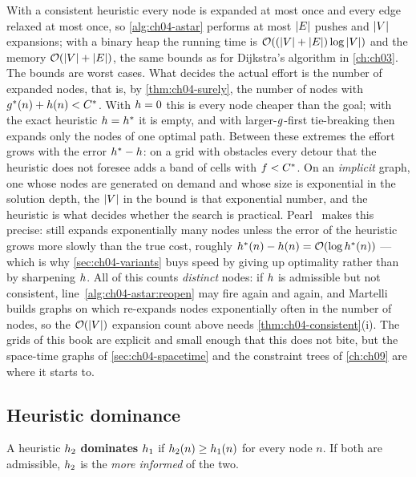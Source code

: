 With a consistent heuristic every node is expanded at most once and every
edge relaxed at most once, so \cref{alg:ch04-astar} performs at most $\left\lvert E \right\rvert$
pushes and $\left\lvert V \right\rvert$ expansions; with a binary heap the running time is
$\mathcal{O}\!\left((\left\lvert V \right\rvert + \left\lvert E \right\rvert) \log \left\lvert V \right\rvert\right)$ and the memory $\mathcal{O}\!\left(\left\lvert V \right\rvert +
\left\lvert E \right\rvert\right)$, the same bounds as for Dijkstra's algorithm in \cref{ch:ch03}. The
bounds are worst cases. What decides the actual effort is the number of
expanded nodes, that is, by \cref{thm:ch04-surely}, the number of nodes with
$g^*(n) + h(n) < C^*$. With $h = 0$ this is every node cheaper
than the goal; with the exact heuristic $h = h^*$ it is empty, and
with larger-$g$-first tie-breaking \astar then expands only the nodes of
one optimal path. Between these extremes the effort grows with the error
$h^* - h$: on a grid with obstacles every detour that the heuristic
does not foresee adds a band of cells with $f < C^*$.
On an \emph{implicit} graph, one whose nodes are generated on demand and whose
size is exponential in the solution depth, the $\left\lvert V \right\rvert$ in the bound is that
exponential number, and the heuristic is what decides whether the search is
practical. Pearl~\cite{pearl1984heuristics} makes this precise: \astar
still expands exponentially many nodes unless the error of the heuristic grows
more slowly than the true cost, roughly $h^*(n) - h(n) =
\mathcal{O}\!\left(\log h^*(n)\right)$ --- which is why \cref{sec:ch04-variants} buys speed
by giving up optimality rather than by sharpening $h$.
All of this counts \emph{distinct} nodes: if $h$ is admissible but not
consistent, line~\ref{alg:ch04-astar:reopen} may fire again and again, and
Martelli~\cite{martelli1977complexity} builds graphs on which \astar re-expands
nodes exponentially often in the number of nodes, so the $\mathcal{O}\!\left(\left\lvert V \right\rvert\right)$
expansion count above needs \cref{thm:ch04-consistent}(i).
The grids of this book are explicit and small enough that this does not bite,
but the space-time graphs of \cref{sec:ch04-spacetime} and the constraint
trees of \cref{ch:ch09} are where it starts to.

\subsection{Heuristic dominance}

\begin{definition}[Dominance]
\label{def:ch04-dominance}
A heuristic $h_2$ \textbf{dominates} $h_1$ if
$h_2(n) \ge h_1(n)$ for every node $n$. If both are admissible,
$h_2$ is the \emph{more informed} of the two.
\end{definition}

